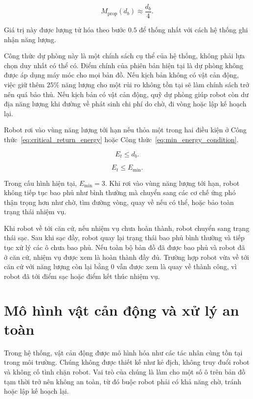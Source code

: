 \documentclass[../DoAn.tex]{subfiles}
\begin{document}
\begin{equation}
    M_{\text{prop}}(d_b)\approx \frac{d_b}{4}.
    \label{eq:proportional_return_margin}
\end{equation}

Giá trị này được lượng tử hóa theo bước $0.5$ để thống nhất với cách hệ thống ghi nhận năng lượng.

Công thức dự phòng này là một chính sách cụ thể của hệ thống, không phải lựa chọn duy nhất có thể có. Điểm chính của phiên bản hiện tại là dự phòng không được áp dụng máy móc cho mọi bản đồ. Nếu kịch bản không có vật cản động, việc giữ thêm $25\%$ năng lượng cho một rủi ro không tồn tại sẽ làm chính sách trở nên quá bảo thủ. Nếu kịch bản có vật cản động, quỹ dự phòng giúp robot còn dư địa năng lượng khi đường về phát sinh chi phí do chờ, đi vòng hoặc lập kế hoạch lại.

Robot rơi vào vùng năng lượng tới hạn nếu thỏa một trong hai điều kiện ở Công thức~\ref{eq:critical_return_energy} hoặc Công thức~\ref{eq:min_energy_condition}.

\begin{equation}
    E_t \le d_b.
    \label{eq:critical_return_energy}
\end{equation}

\begin{equation}
    E_t \le E_{\min}.
    \label{eq:min_energy_condition}
\end{equation}

Trong cấu hình hiện tại, $E_{\min}=3$. Khi rơi vào vùng năng lượng tới hạn, robot không tiếp tục bao phủ như bình thường mà chuyển sang các cơ chế ứng phó thận trọng hơn như chờ, tìm đường vòng, quay về nếu có thể, hoặc bảo toàn trạng thái nhiệm vụ.

Khi robot về tới căn cứ, nếu nhiệm vụ chưa hoàn thành, robot chuyển sang trạng thái sạc. Sau khi sạc đầy, robot quay lại trạng thái bao phủ bình thường và tiếp tục xử lý các ô chưa bao phủ. Nếu toàn bộ bản đồ đã được bao phủ và robot đã ở căn cứ, nhiệm vụ được xem là hoàn thành đầy đủ. Trường hợp robot vừa về tới căn cứ với năng lượng còn lại bằng 0 vẫn được xem là quay về thành công, vì robot đã tới điểm sạc hoặc điểm kết thúc nhiệm vụ.

\section{Mô hình vật cản động và xử lý an toàn}

Trong hệ thống, vật cản động được mô hình hóa như các tác nhân cùng tồn tại trong môi trường. Chúng không được thiết kế như kẻ địch, không truy đuổi robot và không cố tình chặn robot. Vai trò của chúng là làm cho một số ô trên bản đồ tạm thời trở nên không an toàn, từ đó buộc robot phải có khả năng chờ, tránh hoặc lập kế hoạch lại.
\end{document}
